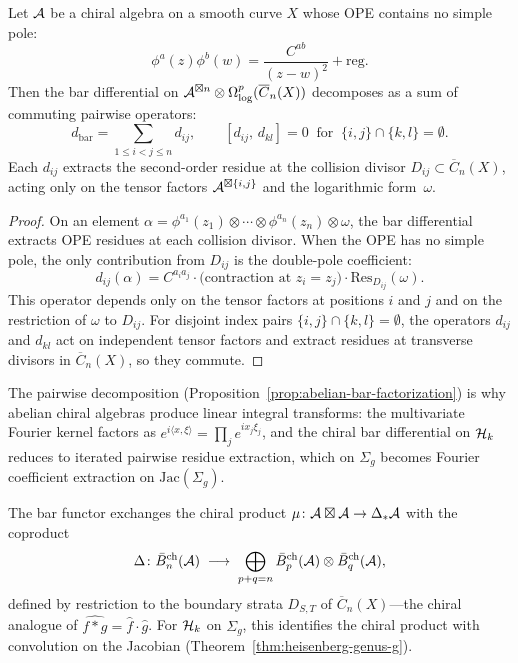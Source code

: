\begin{proposition}
\label{prop:abelian-bar-factorization}
Let\/ $\mathcal{A}$ be a chiral algebra on a smooth curve $X$ whose OPE
contains no simple pole:
\[
\phi^a(z)\phi^b(w)
= \frac{C^{ab}}{(z-w)^2} + \mathrm{reg}.
\]
Then the bar differential on
$\mathcal{A}^{\boxtimes n} \otimes \Omega^p_{\log}(\overline{C}_n(X))$
decomposes as a sum of commuting pairwise operators:
\[
d_{\mathrm{bar}} = \sum_{1 \leq i < j \leq n} d_{ij},
\qquad
[d_{ij},\, d_{kl}] = 0
\;\;\text{for}\;\;
\{i,j\} \cap \{k,l\} = \emptyset.
\]
Each $d_{ij}$ extracts the second-order residue at the collision
divisor $D_{ij} \subset \overline{C}_n(X)$, acting only on the
tensor factors $\mathcal{A}^{\boxtimes\{i,j\}}$ and the logarithmic
form~$\omega$.
\end{proposition}

\begin{proof}
On an element
$\alpha = \phi^{a_1}(z_1) \otimes \cdots \otimes \phi^{a_n}(z_n)
\otimes \omega$,
the bar differential extracts OPE residues at each collision
divisor.  When the OPE has no simple pole, the only contribution
from $D_{ij}$ is the double-pole coefficient:
\[
d_{ij}(\alpha)
= C^{a_i a_j}
  \cdot \bigl(\text{contraction at } z_i = z_j\bigr)
  \cdot \mathrm{Res}_{D_{ij}}(\omega).
\]
This operator depends only on the tensor factors at positions $i$
and $j$ and on the restriction of $\omega$ to $D_{ij}$.  For
disjoint index pairs $\{i,j\} \cap \{k,l\} = \emptyset$, the
operators $d_{ij}$ and $d_{kl}$ act on independent tensor factors
and extract residues at transverse divisors in
$\overline{C}_n(X)$, so they commute.
\end{proof}

\begin{remark}
\label{rem:pairwise-to-fourier}
The pairwise decomposition (Proposition~\ref{prop:abelian-bar-factorization}) is why abelian chiral algebras produce linear integral transforms: the multivariate Fourier kernel factors as $e^{i\langle x,\xi\rangle} = \prod_j e^{ix_j\xi_j}$, and the chiral bar differential on $\mathcal{H}_k$ reduces to iterated pairwise residue extraction, which on $\Sigma_g$ becomes Fourier coefficient extraction on $\mathrm{Jac}(\Sigma_g)$.
\end{remark}

\begin{remark}
\label{rem:convolution-exchange}
The bar functor exchanges the chiral product $\mu\colon \mathcal{A} \boxtimes \mathcal{A} \to \Delta_* \mathcal{A}$ with the coproduct
\[
\Delta\colon \bar{B}^{\mathrm{ch}}_n(\mathcal{A})
\;\longrightarrow\;
\bigoplus_{p+q=n} \bar{B}^{\mathrm{ch}}_p(\mathcal{A})
  \otimes \bar{B}^{\mathrm{ch}}_q(\mathcal{A}),
\]
defined by restriction to the boundary strata $D_{S,T}$ of $\overline{C}_n(X)$---the chiral analogue of $\widehat{f * g} = \hat{f} \cdot \hat{g}$.  For $\mathcal{H}_k$ on $\Sigma_g$, this identifies the chiral product with convolution on the Jacobian (Theorem~\ref{thm:heisenberg-genus-g}).
\end{remark}

